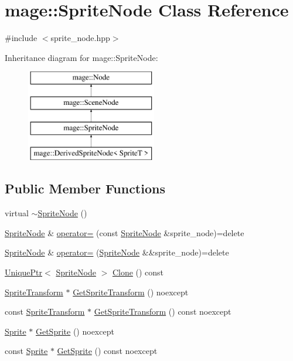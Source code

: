 \hypertarget{classmage_1_1_sprite_node}{}\section{mage\+:\+:Sprite\+Node Class Reference}
\label{classmage_1_1_sprite_node}


{\ttfamily \#include $<$sprite\+\_\+node.\+hpp$>$}

Inheritance diagram for mage\+:\+:Sprite\+Node\+:\begin{figure}[H]
\begin{center}
\leavevmode
\includegraphics[height=4.000000cm]{classmage_1_1_sprite_node}
\end{center}
\end{figure}
\subsection*{Public Member Functions}
\begin{DoxyCompactItemize}
\item 
virtual \hyperlink{classmage_1_1_sprite_node_a04ada795f035b935af9992a6b7a75959}{$\sim$\+Sprite\+Node} ()
\item 
\hyperlink{classmage_1_1_sprite_node}{Sprite\+Node} \& \hyperlink{classmage_1_1_sprite_node_a009228c9f53671a4275534ceb7733bd0}{operator=} (const \hyperlink{classmage_1_1_sprite_node}{Sprite\+Node} \&sprite\+\_\+node)=delete
\item 
\hyperlink{classmage_1_1_sprite_node}{Sprite\+Node} \& \hyperlink{classmage_1_1_sprite_node_a908ba50d10d6573e913a8c2d785c7d69}{operator=} (\hyperlink{classmage_1_1_sprite_node}{Sprite\+Node} \&\&sprite\+\_\+node)=delete
\item 
\hyperlink{namespacemage_a3316d7143a973e37adf1110f2e80ca31}{Unique\+Ptr}$<$ \hyperlink{classmage_1_1_sprite_node}{Sprite\+Node} $>$ \hyperlink{classmage_1_1_sprite_node_a16481829a3796abd5afe5ce0c9ebf578}{Clone} () const
\item 
\hyperlink{classmage_1_1_sprite_transform}{Sprite\+Transform} $\ast$ \hyperlink{classmage_1_1_sprite_node_a99d90a2a337a45c0623022756c53f214}{Get\+Sprite\+Transform} () noexcept
\item 
const \hyperlink{classmage_1_1_sprite_transform}{Sprite\+Transform} $\ast$ \hyperlink{classmage_1_1_sprite_node_a021d8d7d51a05330bfa6d034482988a0}{Get\+Sprite\+Transform} () const noexcept
\item 
\hyperlink{classmage_1_1_sprite}{Sprite} $\ast$ \hyperlink{classmage_1_1_sprite_node_a84806dd38c94900f0fabf0163a706370}{Get\+Sprite} () noexcept
\item 
const \hyperlink{classmage_1_1_sprite}{Sprite} $\ast$ \hyperlink{classmage_1_1_sprite_node_a585276a679d83576464014eeb156cf10}{Get\+Sprite} () const noexcept
\end{DoxyCompactItemize}
